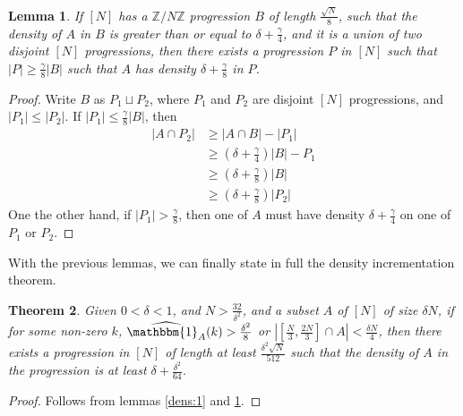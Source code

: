 \documentclass[12pt, titlepage]{article}
\newtheorem{thm}{Theorem}[section]
\newtheorem{lem}[thm]{Lemma}
\theoremstyle{definition}
\newcommand{\znz}{\mathbb{Z}/N\mathbb{Z}}
\newcommand{\indi}{\mathbbm{1}}
\begin{document}
\begin{lem} \label{dens:2}
    If $[N]$ has a $\znz$ progression $B$ of length $\frac{\sqrt{N}}{8}$, such that the density of $A$ in $B$ is greater than or equal to $\delta + \frac{\gamma}{4}$, and it is a union of two disjoint $[N]$ progressions, then there exists a progression $P$ in $[N]$ such that $|P| \geq \frac{\gamma}{8} |B|$ such that $A$ has density $\delta + \frac{\gamma}{8}$ in $P$.
\end{lem}

\begin{proof}
    Write $B$ as $P_1 \sqcup P_2$, where $P_1$ and $P_2$ are disjoint $[N]$ progressions, and $|P_1| \leq |P_2|$. If $|P_1| \leq \frac{\gamma}{8} |B|$, then
    \begin{align*}
        |A \cap P_2| &\geq |A \cap B| - |P_1|\\
        &\geq \left( \delta + \frac{\gamma}{4} \right)|B| - P_1 \\
        &\geq \left( \delta + \frac{\gamma}{8} \right)|B| \\
        &\geq \left( \delta + \frac{\gamma}{8} \right)|P_2|
    \end{align*}
    One the other hand, if $|P_1| > \frac{\gamma}{8}$, then one of $A$ must have density $\delta + \frac{\gamma}{4}$ on one of $P_1$ or $P_2$.
\end{proof}

With the previous lemmas, we can finally state in full the density incrementation theorem.
\begin{thm}
    Given $0 < \delta < 1$, and $N > \frac{32}{\delta^2}$, and a subset $A$ of $[N]$ of size $\delta N$, if for some non-zero $k$, $\widehat{\indi_A}(k) > \frac{\delta^2}{8}$ or $\left| \left[ \frac{N}{3}, \frac{2N}{3} \right] \cap A \right| < \frac{\delta N}{4}$, then there exists a progression in $[N]$ of length at least $\frac{\delta^2 \sqrt{N}}{512}$ such that the density of $A$ in the progression is at least $\delta + \frac{\delta^2}{64}$.
\end{thm}

\begin{proof}
    Follows from lemmas \ref{dens:1} and \ref{dens:2}.
\end{proof}
\end{document}
